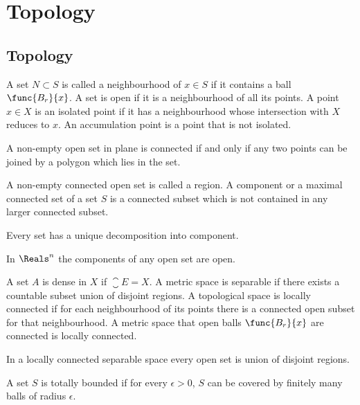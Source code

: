 \chapter{Topology}
\section{Topology}
A set \(N \subset S\) is called a neighbourhood of \(x \in S\) if it contains a ball \(\func{B_r}{x}\). A set is open if it is a neighbourhood of all its points. A point \(x \in X\) is an isolated point if it has a neighbourhood whose intersection with \(X\) reduces to \(x\). An accumulation point is a point that is not isolated. 

\begin{proposition}
      A non-empty open set in plane is connected if and only if any two points can be joined by a polygon which lies in the set.
\end{proposition}

\begin{definition}
      A non-empty connected open set is called a region. A component or a maximal connected set of a set \(S\) is a connected subset which is not contained in any larger connected subset.
\end{definition}

\begin{proposition}
      Every set has a unique decomposition into component.
\end{proposition}

\begin{proposition}
      In \(\Reals^n\) the components of any open set are open.
\end{proposition}

\begin{definition}
      A set \(A\) is dense in \(X\) if \(\closure E = X\). A metric space is separable if there exists a countable subset union of disjoint regions. A topological space is locally connected if for each neighbourhood of its points there is a connected open subset for that neighbourhood. A metric space that open balls \(\func{B_r}{x}\) are connected is locally connected.
\end{definition}

\begin{proposition}
      In a locally connected separable space every open set is union of disjoint regions.
\end{proposition}

\begin{definition}
      A set \(S\) is totally bounded if for every \(\epsilon > 0\), \(S\) can be covered by finitely many balls of radius \(\epsilon\).
\end{definition}


